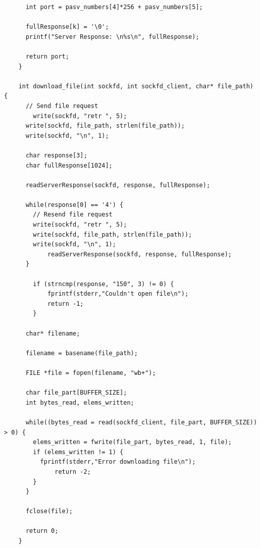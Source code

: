 \documentclass[article, a4paper, 11pt, oneside]{memoir}
\begin{document}
\begin{lstlisting}
	  int port = pasv_numbers[4]*256 + pasv_numbers[5];
	
	  fullResponse[k] = '\0';
	  printf("Server Response: \n%s\n", fullResponse);
	
	  return port;
	}
	
	int download_file(int sockfd, int sockfd_client, char* file_path) {
	  // Send file request
		write(sockfd, "retr ", 5);
	  write(sockfd, file_path, strlen(file_path));
	  write(sockfd, "\n", 1);
	
	  char response[3];
	  char fullResponse[1024];
	
	  readServerResponse(sockfd, response, fullResponse);
	
	  while(response[0] == '4') {
		// Resend file request
		write(sockfd, "retr ", 5);
		write(sockfd, file_path, strlen(file_path));
		write(sockfd, "\n", 1);
			readServerResponse(sockfd, response, fullResponse);
	  }
	
		if (strncmp(response, "150", 3) != 0) {
			fprintf(stderr,"Couldn't open file\n");
			return -1;
		}
	
	  char* filename;
	
	  filename = basename(file_path);
	
	  FILE *file = fopen(filename, "wb+");
	  
	  char file_part[BUFFER_SIZE];
	  int bytes_read, elems_written;
	
	  while((bytes_read = read(sockfd_client, file_part, BUFFER_SIZE)) > 0) {
		elems_written = fwrite(file_part, bytes_read, 1, file);
		if (elems_written != 1) {
		  fprintf(stderr,"Error downloading file\n");
			  return -2;
		}
	  }
	
	  fclose(file);
	
	  return 0;
	}
\end{lstlisting}
\end{document}
